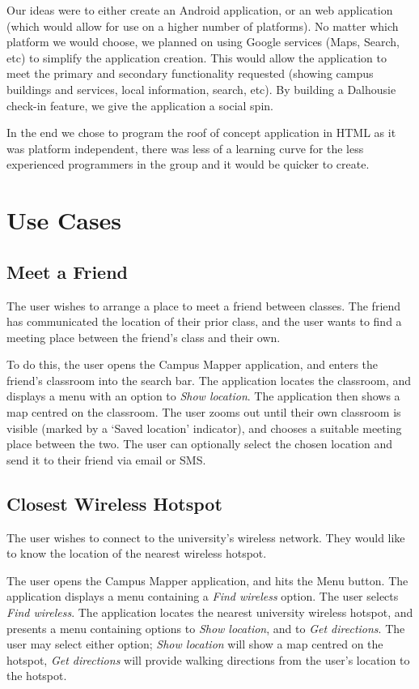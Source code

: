 \documentclass{article}
\begin{document}
Our ideas were to either create an Android application, or an web application
(which would allow for use on a higher number of platforms). No matter which
platform we would choose, we planned on using Google services (Maps, Search,
etc) to simplify the application creation. This would allow the application to
meet the primary and secondary functionality requested (showing campus buildings
and services, local information, search, etc). By building a Dalhousie check-in
feature, we give the application a social spin.

In the end we chose to program the roof of concept application in HTML as it was
platform independent, there was less of a learning curve for the less
experienced programmers in the group and it would be quicker to create.

\section{Use Cases}
\subsection{Meet a Friend}
The user wishes to arrange a place to meet a friend between classes.
The friend has communicated the location of their prior class, and the user
wants to find a meeting place between the friend's class and their own.

To do this, the user opens the Campus Mapper application, and enters the
friend's classroom into the search bar. The application locates the classroom,
and displays a menu with an option to \emph{Show location}. The application
then shows a map centred on the classroom. The user zooms out until their own
classroom is visible (marked by a `Saved location' indicator), and chooses a
suitable meeting place between the two. The user can optionally select the
chosen location and send it to their friend via email or SMS.

\subsection{Closest Wireless Hotspot}
The user wishes to connect to the university's wireless network. They would like
to know the location of the nearest wireless hotspot.

The user opens the Campus Mapper application, and hits the Menu button. The
application displays a menu containing a \emph{Find wireless} option.
The user selects \emph{Find wireless}. The application locates the nearest
university wireless hotspot, and presents a menu containing options to
\emph{Show location}, and to \emph{Get directions}. The user may select either
option; \emph{Show location} will show a map centred on the hotspot, \emph{Get
directions} will provide walking directions from the user's location to the
hotspot.
\end{document}
